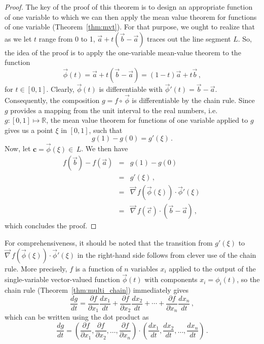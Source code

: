 \begin{proof}
The key of the proof of this theorem is to design an appropriate function of one variable to which we can then apply the mean value theorem for functions of one variable (Theorem~\ref{thm:mvt}). For that purpose, we ought to realize that as we let $t$ range from 0 to 1, $\vec{a}+t(\vec{b}-\vec{a})$ traces out the line segment $L$.   So, the idea of the proof is to apply the one-variable mean-value theorem to the function
$$
\vec{\phi}(t) =\vec{a}+t\left(\vec{b}-\vec{a}\right)=(1-t)\vec{a}+t\vec{b}\,,
$$
for $t\in[0,1]$. Clearly, $\vec{\phi}(t)$ is differentiable with $\vec{\phi}'(t)=\vec{b}-\vec{a}$. Consequently, the composition $g=f\circ\,\vec{\phi}$ is differentiable  by the chain rule. Since $g$ provides a mapping from the unit interval to the real numbers, i.e. $g:[0,1]\mapsto\mathbb{R}$, the mean value theorem for functions of one variable applied to $g$ gives us a point $\xi$ in $[0,1]$, such that
$$
g(1)-g(0)=g'(\xi)\,.
$$
Now, let $\mathbf{c}=\vec{\phi}(\xi)\in\,L$. We then have
\begin{eqnarray*}
f(\vec{b})-f(\vec{a})&=&g(1)-g(0)\\
&=&g'(\xi)\,,\\
&=&\vec{\nabla}\,f\left(\vec{\phi}(\xi)\right)\cdot\vec{\phi}'(\xi)\,\\
&=&\vec{\nabla}\,f(\vec{c})\cdot(\vec{b}-\vec{a})\,,
\end{eqnarray*}
which concludes the proof. 
\end{proof}
For comprehensiveness, it should be noted that the transition from $g'(\xi)$ to $\vec{\nabla}\,f\left(\vec{\phi}(\xi)\right)\cdot\vec{\phi}'(\xi)$ in the right-hand side follows from clever use of the chain rule. More precisely, $f$ is a function of $n$ variables $x_i$ applied to the output of the single-variable vector-valued function $\vec{\phi}(t)$ with components $x_i=\phi_i(t)$, so the chain rule (Theorem~\ref{thm:multi_chain}) immediately gives
$$
\dfrac{dg}{dt}=\dfrac{\partial f}{\partial x_1}\dfrac{dx_1}{dt}+\dfrac{\partial f}{\partial x_2}\dfrac{dx_2}{dt}+\cdots+\dfrac{\partial f}{\partial x_n}\dfrac{dx_n}{dt}\,,
$$
which can be written using the dot product as
$$
\dfrac{dg}{dt}=\left(\dfrac{\partial f}{\partial x_1},\dfrac{\partial f}{\partial x_2},\ldots,\dfrac{\partial f}{\partial x_n}\right)\cdot\left(\dfrac{dx_1}{dt},\dfrac{dx_2}{dt},\ldots,\dfrac{dx_n}{dt}\right)\,.
$$




